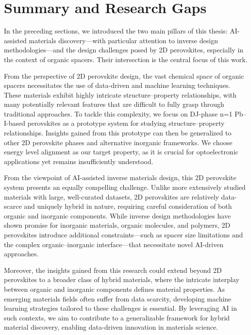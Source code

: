 \section{Summary and Research Gaps}\label{section:section2-3}

In the preceding sections, we introduced the two main pillars of this thesis: AI-assisted materials discovery—with particular attention to inverse design methodologies—and the design challenges posed by 2D perovskites, especially in the context of organic spacers. Their intersection is the central focus of this work.

From the perspective of 2D perovskite design, the vast chemical space of organic spacers necessitates the use of data-driven and machine learning techniques. These materials exhibit highly intricate structure–property relationships, with many potentially relevant features that are difficult to fully grasp through traditional approaches. To tackle this complexity, we focus on DJ-phase n=1 Pb–I-based perovskites as a prototype system for studying structure–property relationships. Insights gained from this prototype can then be generalized to other 2D perovskite phases and alternative inorganic frameworks. We choose energy level alignment as our target property, as it is crucial for optoelectronic applications yet remains insufficiently understood.

From the viewpoint of AI-assisted inverse materials design, this 2D perovskite system presents an equally compelling challenge. Unlike more extensively studied materials with large, well-curated datasets, 2D perovskites are relatively data-scarce and uniquely hybrid in nature, requiring careful consideration of both organic and inorganic components. While inverse design methodologies have shown promise for inorganic materials, organic molecules, and polymers, 2D perovskites introduce additional constraints—such as spacer size limitations and the complex organic–inorganic interface—that necessitate novel AI-driven approaches.

Moreover, the insights gained from this research could extend beyond 2D perovskites to a broader class of hybrid materials, where the intricate interplay between organic and inorganic components defines material properties. As emerging materials fields often suffer from data scarcity, developing machine learning strategies tailored to these challenges is essential. By leveraging AI in such contexts, we aim to contribute to a generalizable framework for hybrid material discovery, enabling data-driven innovation in materials science.

